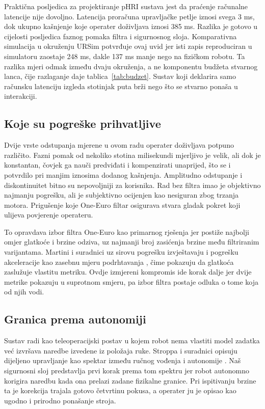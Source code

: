 Praktična posljedica za projektiranje pHRI sustava jest da praćenje računalne latencije nije dovoljno. Latencija proračuna upravljačke petlje iznosi svega 3 ms, dok ukupno kašnjenje koje operater doživljava iznosi 385 ms. Razlika je gotovo u cijelosti posljedica faznog pomaka filtra i sigurnosnog sloja. Komparativna simulacija u okruženju URSim potvrđuje ovaj uvid jer isti zapis reproduciran u simulatoru zaostaje 248 ms, dakle 137 ms manje nego na fizičkom robotu. Ta razlika mjeri odmak između dvaju okruženja, a ne komponentu budžeta stvarnog lanca, čije razlaganje daje tablica~\ref{tab:budzet}. Sustav koji deklarira samo računsku latenciju izgleda stotinjak puta brži nego što se stvarno ponaša u interakciji.

\subsection{Koje su pogreške prihvatljive}

Dvije vrste odstupanja mjerene u ovom radu operater doživljava potpuno
različito. Fazni pomak od nekoliko stotina milisekundi mjerljivo je velik, ali
dok je konstantan, čovjek ga nauči predviđati i kompenzirati unaprijed, što
se i potvrdilo pri manjim iznosima dodanog kašnjenja. Amplitudno odstupanje i
diskontinuitet bitno su nepovoljniji za korisnika. Rad bez filtra imao je objektivno najmanju pogrešku,
ali je subjektivno ocijenjen kao nesiguran zbog trzanja motora. Prigušenje koje One-Euro filtar osigurava
stvara gladak pokret koji ulijeva povjerenje operateru.

To opravdava izbor filtra One-Euro kao primarnog rješenja jer postiže najbolji omjer glatkoće i brzine odziva, uz najmanji broj zasićenja brzine među filtriranim varijantama. Martini i suradnici uz sirovu pogrešku izvještavaju i pogrešku akceleracije kao zasebnu mjeru podrhtavanja \cite[str.~5]{martini2024}, čime pokazuju da glatkoća zaslužuje vlastitu metriku. Ovdje izmjereni kompromis ide korak dalje jer dvije metrike pokazuju u suprotnom smjeru, pa izbor filtra postaje odluka o tome koja od njih vodi.

\subsection{Granica prema autonomiji}

Sustav radi kao teleoperacijski postav u kojem robot nema vlastiti model zadatka već izvršava naredbe izvedene iz položaja ruke. Stroppa i suradnici opisuju dijeljeno upravljanje kao spektar između ručnog vođenja i autonomije \cite[str.~5]{stroppa2023}. Naš sigurnosni sloj predstavlja prvi korak prema tom spektru jer robot autonomno korigira naredbu kada ona prelazi zadane fizikalne granice. Pri ispitivanju brzine ta je korekcija trajala gotovo četvrtinu pokusa, a operater ju je opisao kao ugodno i prirodno ponašanje stroja.

